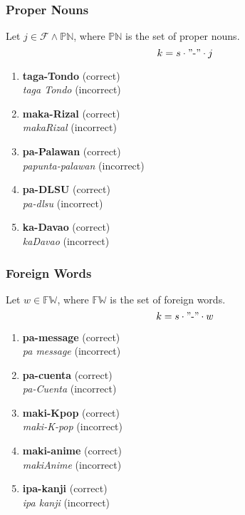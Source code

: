 \subsubsection{Proper Nouns}
\label{proper_nouns_chapter}
Let \(j \in \mathcal{F} \wedge \mathbb{PN}\), where \(\mathbb{PN}\) is the set of proper nouns.
\[
      k = s \cdot "\text{-}" \cdot j
\]
\begin{example}
\end{example}
\begin{enumerate}
      \item \textbf{taga-Tondo} (correct) \\
            \textit{taga Tondo} (incorrect)
      \item \textbf{maka-Rizal} (correct) \\
            \textit{makaRizal} (incorrect)
      \item \textbf{pa-Palawan} (correct) \\
            \textit{papunta-palawan} (incorrect)
      \item \textbf{pa-DLSU} (correct) \\
            \textit{pa-dlsu} (incorrect)
      \item \textbf{ka-Davao} (correct) \\
            \textit{kaDavao} (incorrect)
\end{enumerate}

\subsubsection{Foreign Words}
Let \(w \in \mathbb{FW}\), where \(\mathbb{FW}\) is the set of foreign words.
\[
      k = s \cdot "\text{-}" \cdot w
\]
\begin{example}
\end{example}
\begin{enumerate}
      \item \textbf{pa-message} (correct) \\
            \textit{pa message} (incorrect)
      \item \textbf{pa-cuenta} (correct) \\
            \textit{pa-Cuenta} (incorrect)
      \item \textbf{maki-Kpop} (correct) \\
            \textit{maki-K-pop} (incorrect)
      \item \textbf{maki-anime} (correct) \\
            \textit{makiAnime} (incorrect)
      \item \textbf{ipa-kanji} (correct) \\
            \textit{ipa kanji} (incorrect)
\end{enumerate}

